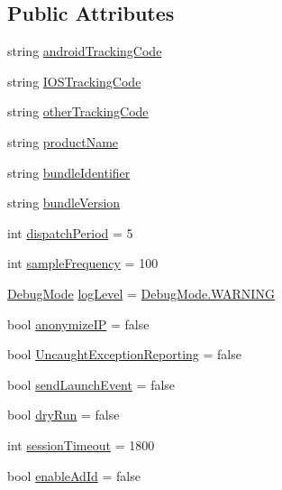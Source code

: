 \subsection*{Public Attributes}
\begin{DoxyCompactItemize}
\item 
string \hyperlink{class_google_analytics_v4_a1c52bd79c88d28dc88b54497a2eb0d69}{android\+Tracking\+Code}
\item 
string \hyperlink{class_google_analytics_v4_a87415fc92cb4966dd53507028056b4c2}{I\+O\+S\+Tracking\+Code}
\item 
string \hyperlink{class_google_analytics_v4_ad2372f0f31ff1a7c69a721f1e5547788}{other\+Tracking\+Code}
\item 
string \hyperlink{class_google_analytics_v4_a0d120870bcfac2f93f347990734e376e}{product\+Name}
\item 
string \hyperlink{class_google_analytics_v4_a9fb2933a542f0d9235951bbffc2eeb60}{bundle\+Identifier}
\item 
string \hyperlink{class_google_analytics_v4_a410bdabf3b82bff5789e5528fcd0b5ed}{bundle\+Version}
\item 
int \hyperlink{class_google_analytics_v4_aa04cf9624fae00ae8800f3d81b6fb10f}{dispatch\+Period} = 5
\item 
int \hyperlink{class_google_analytics_v4_a497d47c6dfaa9f9251e253189032dd86}{sample\+Frequency} = 100
\item 
\hyperlink{class_google_analytics_v4_a53191bc619081f5781932db905fbf30d}{Debug\+Mode} \hyperlink{class_google_analytics_v4_a9c4ee85167be123b5027d0fa25f35891}{log\+Level} = \hyperlink{class_google_analytics_v4_a53191bc619081f5781932db905fbf30da059e9861e0400dfbe05c98a841f3f96b}{Debug\+Mode.\+W\+A\+R\+N\+I\+NG}
\item 
bool \hyperlink{class_google_analytics_v4_ab3f41278a8c7829b332479e0be3090cb}{anonymize\+IP} = false
\item 
bool \hyperlink{class_google_analytics_v4_a4ba1da2a054e29b6eccd1e9b67af2c35}{Uncaught\+Exception\+Reporting} = false
\item 
bool \hyperlink{class_google_analytics_v4_aa5a1a10589d3589249ce0b187cc822d0}{send\+Launch\+Event} = false
\item 
bool \hyperlink{class_google_analytics_v4_a13445aa1c18334f65420c9b0e52d35ed}{dry\+Run} = false
\item 
int \hyperlink{class_google_analytics_v4_ac0381b2b4726441019a7e434e01eb698}{session\+Timeout} = 1800
\item 
bool \hyperlink{class_google_analytics_v4_ab06f6d44cd37e97e67fa341e5c60693c}{enable\+Ad\+Id} = false
\end{DoxyCompactItemize}
